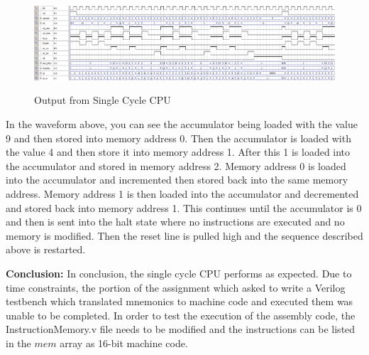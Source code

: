 \documentclass{article}         %
\begin{document}
\begin{figure}[H]
\begin{center}
\includegraphics[scale=0.29]{waveform.png}\\
\end{center}
\caption{Output from Single Cycle CPU}
\end{figure}

In the waveform above, you can see the accumulator being loaded with the value 9 and then stored into memory address 0. Then the accumulator is loaded with the value 4 and then store it into memory address 1. After this 1 is loaded into the accumulator and stored in memory address 2. Memory address 0 is loaded into the accumulator and incremented then stored back into the same memory address. Memory address 1 is then loaded into the accumulator and decremented and stored back into memory address 1. This continues until the accumulator is 0 and then is sent into the halt state where no instructions are executed and no memory is modified. Then the reset line is pulled high and the sequence described above is restarted.\\

\newpage

\textbf{Conclusion:} In conclusion, the single cycle CPU performs as expected. Due to time constraints, the portion of the assignment which asked to write a Verilog testbench which translated mnemonics to machine code and executed them was unable to be completed. In order to test the execution of the assembly code, the InstructionMemory.v file needs to be modified and the instructions can be listed in the $mem$ array as 16-bit machine code.
\end{document}
